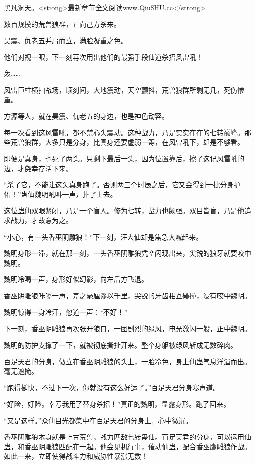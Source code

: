 
\begin{this_body}

黑凡洞天。<strong>最新章节全文阅读www.QiuSHU.cc</strong>

数百规模的荒兽狼群，正向己方杀来。

昊震、仇老五并肩而立，满脸凝重之色。

他们对视一眼，下一刻再次用出他们的最强手段仙道杀招风雷吼！

轰……

风雷巨柱横扫战场，顷刻间，大地震动，天空颤抖，荒兽狼群所剩无几，死伤惨重。

方源等人，就在昊震、仇老五的身边，也是神色动容。

每一次看到这风雷吼，都不禁心头震动。这种战力，乃是实实在在的七转巅峰。那些荒兽狼群，大多只是分身，比真身还要虚弱一筹，在风雷吼下，却是不够看。

即便是真身，也死了两头。只剩下最后一头，因为位置靠后，擦了这记风雷吼的边，才侥幸存活下来。

“杀了它，不能让这头真身跑了。否则两三个时辰之后，它又会得到一批分身护佑！”蛊仙魏明吼叫一声，扑了上去。

这位蛊仙双眼紧闭，乃是一个盲人。修为七转，战力也颇强。双目皆盲，乃是他追求战力，才故意为之。

“小心，有一头香巫阴雕狼！”下一刻，汪大仙却是焦急大喊起来。

魏明身形一滞，就在那一刻，一头香巫阴雕狼凭空闪现出来，尖锐的狼牙就要咬中魏明。

魏明冷喝一声，身形好似幻影，向左后方飞退。

香巫阴雕狼咔嚓一声，差之毫厘谬以千里，尖锐的牙齿相互碰撞，没有咬中魏明。

魏明惊得一身冷汗，忽道一声：“不好！”

下一刻，香巫阴雕狼再次张开狼口，一团剧烈的绿风，电光激闪一般，正中魏明。

魏明的防护支撑了一下，就被彻底撕扯开来。整个身躯被绿风斩成无数碎肉。

百足天君的分身，傲立在香巫阴雕狼的头上，一脸冷色，身上仙蛊气息洋溢而出。毫无遮掩。

“跑得挺快，不过下一次，你就没有这么好运了。”百足天君分身寒声道。

“好险，好险。幸亏我用了替身杀招！”真正的魏明，显露身形。跑了回来。

“又是这样。”众仙目光都集中在百足天君的分身上，心中微沉。

香巫阴雕狼本身就是上古荒兽，战力匹敌七转蛊仙。百足天君的分身，可以运用仙蛊，和香巫阴雕狼匹配在一起。他会见机行事，催动仙蛊，配合香巫鹰雕狼作战。如此一来，立即使得战斗力和威胁性暴涨无数！


\end{this_body}
